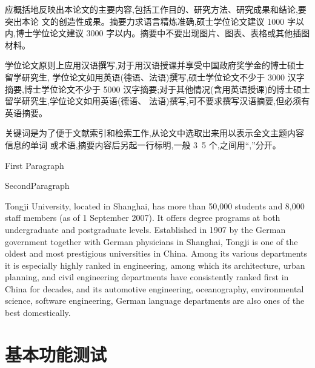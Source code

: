 \documentclass{tjumaster}
\begin{document}
	\makethesiscover %



\begin{cabstract}
应概括地反映出本论文的主要内容,包括工作目的、研究方法、研究成果和结论,要突出本论
 文的创造性成果。摘要力求语言精炼准确,硕士学位论文建议 1000
  字以内,博士学位论文建议 3000 字以内。摘要中不要出现图片、图表、表格或其他插图材料。


学位论文原则上应用汉语撰写,对于用汉语授课并享受中国政府奖学金的博士硕士留学研究生,
 学位论文如用英语(德语、法语)撰写,硕士学位论文不少于 3000
  汉字摘要,博士学位论文不少于 5000
   汉字摘要;对于其他情况(含用英语授课)的博士硕士留学研究生,学位论文如用英语(德语、
    法语)撰写,可不要求撰写汉语摘要,但必须有英语摘要。


关键词是为了便于文献索引和检索工作,从论文中选取出来用以表示全文主题内容信息的单词 或术语,摘要内容后另起一行标明,一般 3~5 个,之间用“,”分开。

	
\end{cabstract}

\begin{eabstract}
	First Paragraph
	
	SecondParagraph
	
	Tongji University, located in Shanghai, has more than 50,000 students and 8,000 staff members (as of 1 September 2007). It offers degree programs at both undergraduate and postgraduate levels. Established in 1907 by the German government together with German physicians in Shanghai, Tongji is one of the oldest and most prestigious universities in China. Among its various departments it is especially highly ranked in engineering, among which its architecture, urban planning, and civil engineering departments have consistently ranked first in China for decades, and its automotive engineering, oceanography, environmental science, software engineering, German language departments are also ones of the best domestically.
	
\end{eabstract}



\frontmatter
\tableofcontents


\clearpage %
\mainmatter




\section{基本功能测试}
\end{document}
